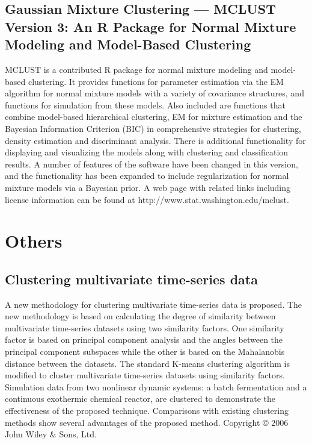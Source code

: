 \documentclass{llncs}
\begin{document}
\subsection{Gaussian
Mixture Clustering --- MCLUST Version 3: An R Package for Normal Mixture Modeling and Model-Based Clustering\cite{fraley2006mclust}}
MCLUST is a contributed R package for normal mixture modeling and model-based clustering. It provides functions for parameter estimation via the EM algorithm for normal mixture models with a variety of covariance structures, and functions for simulation from these models. Also included are functions that combine model-based hierarchical clustering, EM for mixture estimation and the Bayesian Information Criterion (BIC) in comprehensive strategies for clustering, density estimation and discriminant analysis. There is additional functionality for displaying and visualizing the models along with clustering and classification results. A number of features of the software have been changed in this version, and the functionality has been expanded to include regularization for normal mixture models via a Bayesian prior. A web page with related links including license information can be found at http://www.stat.washington.edu/mclust.

\section{Others}
\subsection{Clustering multivariate time-series data\cite{singhal2005clustering}}
A new methodology for clustering multivariate time-series data is proposed. The new methodology is based on calculating the degree of similarity between multivariate time-series datasets using two similarity factors. One similarity factor is based on principal component analysis and the angles between the principal component subspaces while the other is based on the Mahalanobis distance between the datasets. The standard K-means clustering algorithm is modified to cluster multivariate time-series datasets using similarity factors. Simulation data from two nonlinear dynamic systems: a batch fermentation and a continuous exothermic chemical reactor, are clustered to demonstrate the effectiveness of the proposed technique. Comparisons with existing clustering methods show several advantages of the proposed method. Copyright © 2006 John Wiley \& Sons, Ltd.
\end{document}
